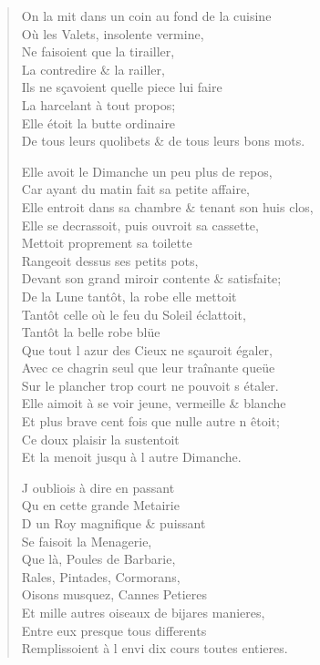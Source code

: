 \documentclass[14pt,a4paper]{memoir}
\begin{document}
{{\begin{otherlanguage}{french}
\begin{verse}
On la mit dans un coin au fond de la cuisine \\
\vin Où les Valets, insolente vermine, \\
\vin Ne faisoient que la tirailler, \\
\vin La contredire \& la railler, \\
\vin Ils ne sçavoient quelle piece lui faire \\
\vin La harcelant à tout propos; \\
\vin Elle étoit la butte ordinaire \\
De tous leurs quolibets \& de tous leurs bons mots.

Elle avoit le Dimanche un peu plus de repos, \\
Car ayant du matin fait sa petite affaire, \\
Elle entroit dans sa chambre \& tenant son huis clos, \\
Elle se decrassoit, puis ouvroit sa cassette, \\
\vin Mettoit proprement sa toilette \\
\vin Rangeoit dessus ses petits pots, \\
Devant son grand miroir contente \& satisfaite; \\
De la Lune tantôt, la robe elle mettoit \\
Tantôt celle où le feu du Soleil éclattoit, \\
\vin Tantôt la belle robe blüe \\
Que tout l\textquotesingle{} azur des Cieux ne sçauroit égaler, \\
Avec ce chagrin seul que leur traînante queüe \\
Sur le plancher trop court ne pouvoit s\textquotesingle{} étaler. \\
Elle aimoit à se voir jeune, vermeille \& blanche \\
Et plus brave cent fois que nulle autre n\textquotesingle{} êtoit; \\
\vin Ce doux plaisir la sustentoit \\
\vin Et la menoit jusqu\textquotesingle{} à l\textquotesingle{} autre Dimanche.

\vin J\textquotesingle{} oubliois à dire en passant \\
\vin Qu\textquotesingle{} en cette grande Metairie \\
\vin D\textquotesingle{} un Roy magnifique \& puissant \\
\vin Se faisoit la Menagerie, \\
\vin Que là, Poules de Barbarie, \\
\vin Rales, Pintades, Cormorans, \\
\vin Oisons musquez, Cannes Petieres \\
Et mille autres oiseaux de bijares manieres, \\
\vin Entre eux presque tous differents \\
Remplissoient à l\textquotesingle{} envi dix cours toutes entieres.


\end{verse}
\end{otherlanguage}}}
\end{document}
